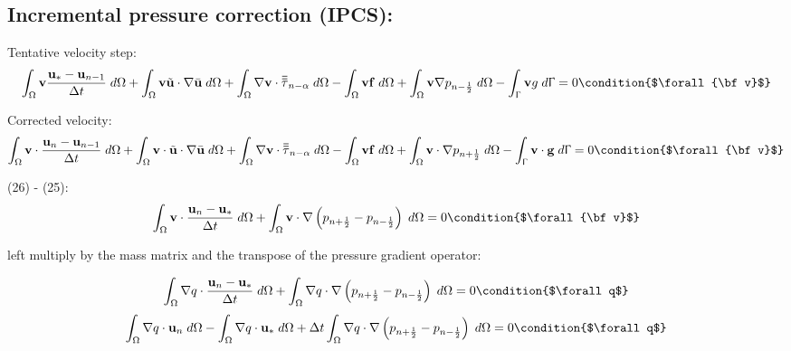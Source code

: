 \documentclass[11pt,a4paper]{article}
\begin{document}
\subsection{Incremental pressure correction (IPCS):}

Tentative velocity step:
\begin{dmath}
  \int_\Omega {\bf v} \frac{{\bf u}_* - {\bf u}_{n-1}}{\Delta t} \; d\Omega + \int_\Omega {\bf v} \tilde{{\bf u}} \cdot \nabla \bar{{\bf u}} \; d\Omega + \int_\Omega \nabla {\bf v} \cdot {\bf \bar{\bar{\tau}}}_{n-\alpha} \; d\Omega - \int_\Omega {\bf v} {\bf f} \; d\Omega + \int_\Omega {\bf v} \nabla p_{n-\frac{1}{2}} \; d\Omega \\ - \int_\Upgamma {\bf v} g \; d\Upgamma = 0 \condition{$\forall {\bf v}$}
\end{dmath}

Corrected velocity:
\begin{dmath}
  \int_\Omega {\bf v} \cdot \frac{{\bf u}_n - {\bf u}_{n-1}}{\Delta t} \; d\Omega + \int_\Omega {\bf v} \cdot \tilde{{\bf u}} \cdot \nabla \bar{{\bf u}} \; d\Omega + \int_\Omega \nabla {\bf v} \cdot {\bf \bar{\bar{\tau}}}_{n-\alpha} \; d\Omega - \int_\Omega {\bf v} {\bf f} \; d\Omega + \int_\Omega {\bf v} \cdot \nabla p_{n+\frac{1}{2}} \; d\Omega - \int_\Upgamma {\bf v} \cdot {\bf g} \; d\Upgamma = 0 \condition{$\forall {\bf v}$}
\end{dmath}

(26) - (25):
\begin{dmath}
  \int_\Omega {\bf v} \cdot \frac{{\bf u}_n - {\bf u}_*}{\Delta t} \; d\Omega + \int_\Omega {\bf v} \cdot \nabla \left(p_{n+\frac{1}{2}} - p_{n-\frac{1}{2}} \right) \; d\Omega = 0 \condition{$\forall {\bf v}$}
\end{dmath}

left multiply by the mass matrix and the transpose of the pressure gradient operator:

\begin{dmath}
  \int_\Omega \nabla q \cdot \frac{{\bf u}_n - {\bf u}_*}{\Delta t} \; d\Omega + \int_\Omega \nabla q \cdot \nabla \left(p_{n+\frac{1}{2}} - p_{n-\frac{1}{2}} \right) \; d\Omega = 0 \condition{$\forall q$}
\end{dmath}
\begin{dmath}
  \int_\Omega \nabla q \cdot {\bf u}_n \; d\Omega - \int_\Omega \nabla q \cdot {\bf u}_* \; d\Omega + \Delta t \int_\Omega \nabla q \cdot \nabla \left(p_{n+\frac{1}{2}} - p_{n-\frac{1}{2}} \right) \; d\Omega = 0 \condition{$\forall q$}
\end{dmath}
\end{document}
